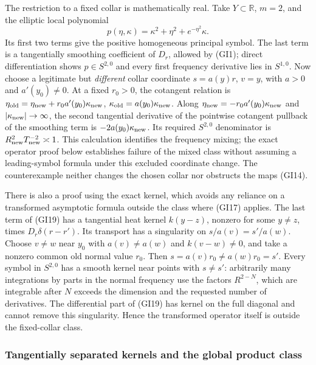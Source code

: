 \documentclass[
  11pt,
]{article}
\begin{document}
The restriction to a fixed collar is mathematically real. Take
\(Y\subset\mathbb R\), \(m=2\), and the elliptic local polynomial \[
 p(\eta,\kappa)=\kappa^2+\eta^2+e^{-\eta^2}\kappa.
 \tag{GI19}
\] Its first two terms give the positive homogeneous principal symbol.
The last term is a tangentially smoothing coefficient of \(D_r\),
allowed by (GI1); direct differentiation shows \(p\in S^{2,0}\) and
every first frequency derivative lies in \(S^{1,0}\). Now choose a
legitimate but \emph{different} collar coordinate \(s=a(y)r\), \(v=y\),
with \(a>0\) and \(a'(y_0)\ne0\). At a fixed \(r_0>0\), the cotangent
relation is
\(\eta_{\rm old}=\eta_{\rm new}+r_0a'(y_0)\kappa_{\rm new}\),
\(\kappa_{\rm old}=a(y_0)\kappa_{\rm new}\). Along
\(\eta_{\rm new}=-r_0a'(y_0)\kappa_{\rm new}\) and
\(|\kappa_{\rm new}|\to\infty\), the second tangential derivative of the
pointwise cotangent pullback of the smoothing term is
\(-2a(y_0)\kappa_{\rm new}\). Its required \(S^{2,0}\) denominator is
\(R_{\rm new}^2T_{\rm new}^{-2}\asymp1\). This calculation identifies
the frequency mixing; the exact operator proof below establishes failure
of the mixed class without assuming a leading-symbol formula under this
excluded coordinate change. The counterexample neither changes the
chosen collar nor obstructs the maps (GI14).

There is also a proof using the exact kernel, which avoids any reliance
on a transformed asymptotic formula outside the class where (GI17)
applies. The last term of (GI19) has a tangential heat kernel
\(k(y-z)\), nonzero for some \(y\ne z\), times \(D_r\delta(r-r')\). Its
transport has a singularity on \(s/a(v)=s'/a(w)\). Choose \(v\ne w\)
near \(y_0\) with \(a(v)\ne a(w)\) and \(k(v-w)\ne0\), and take a
nonzero common old normal value \(r_0\). Then
\(s=a(v)r_0\ne a(w)r_0=s'\). Every symbol in \(S^{2,0}\) has a smooth
kernel near points with \(s\ne s'\): arbitrarily many integrations by
parts in the normal frequency use the factors \(R^{2-N}\), which are
integrable after \(N\) exceeds the dimension and the requested number of
derivatives. The differential part of (GI19) has kernel on the full
diagonal and cannot remove this singularity. Hence the transformed
operator itself is outside the fixed-collar class.

\subsubsection{Tangentially separated kernels and the global product
class}\label{tangentially-separated-kernels-and-the-global-product-class}
\end{document}
